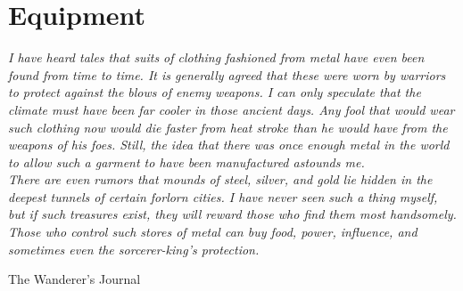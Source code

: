\chapter{Equipment}\label{chap:equipment}
\epigraph{\textit{
    I have heard tales that suits of clothing fashioned from metal have even been
    found from time to time. It is generally agreed that these were worn by
    warriors to protect against the blows of enemy weapons. I can only speculate
    that the climate must have been far cooler in those ancient days. Any fool
    that would wear such clothing now would die faster from heat stroke than he
    would have from the weapons of his foes. Still, the idea that there was once
    enough metal in the world to allow such a garment to have been manufactured
    astounds me.\\
    There are even rumors that mounds of steel, silver, and gold lie hidden in
    the deepest tunnels of certain forlorn cities. I have never seen such a thing
    myself, but if such treasures exist, they will reward those who find them most
    handsomely. Those who control such stores of metal can buy food, power,
    influence, and sometimes even the sorcerer-king’s protection.
} }{
    The Wanderer’s Journal
}

